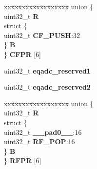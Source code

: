 \begin{DoxyCompactItemize}
\begin{tabbing}
\end{tabbing}\item 
\mbox{\label{structEQADC__tag_a18ece15e015e969ba350e4798d888c6f}} 
\begin{tabbing}
xx\=xx\=xx\=xx\=xx\=xx\=xx\=xx\=xx\=\kill
union \{\\
\>uint32\_t {\bfseries R}\\
\>struct \{\\
\>\>uint32\_t {\bfseries CF\_PUSH}:32\\
\>\} {\bfseries B}\\
\} {\bfseries CFPR} \mbox{[}6\mbox{]}\\

\end{tabbing}\item 
\mbox{\label{structEQADC__tag_a178480466e4299b3de7c001842274c68}} 
uint32\+\_\+t {\bfseries eqadc\+\_\+reserved1}
\item 
\mbox{\label{structEQADC__tag_a39ff3486de393bc80a767e0ef7565ec7}} 
uint32\+\_\+t {\bfseries eqadc\+\_\+reserved2}
\item 
\mbox{\label{structEQADC__tag_a0165a171061af01811185dba03e3fad5}} 
\begin{tabbing}
xx\=xx\=xx\=xx\=xx\=xx\=xx\=xx\=xx\=\kill
union \{\\
\>uint32\_t {\bfseries R}\\
\>struct \{\\
\>\>uint32\_t {\bfseries \_\_pad0\_\_}:16\\
\>\>uint32\_t {\bfseries RF\_POP}:16\\
\>\} {\bfseries B}\\
\} {\bfseries RFPR} \mbox{[}6\mbox{]}\\


\end{tabbing}
\end{DoxyCompactItemize}
